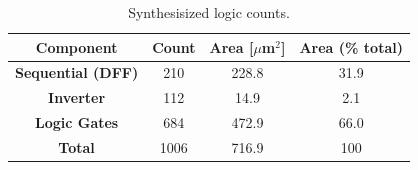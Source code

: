 		\begin{table}[htb!]
			\centering
			\def\arraystretch{1.5}		
			\setlength\arrayrulewidth{0.75pt}
			\setlength{\tabcolsep}{1em} %
			\begin{tabular}{|c|c|c|c|}
				\hline 
				\rule[-1ex]{0pt}{2.5ex} \cellcolor{gray!40}\textbf{Component} & \cellcolor{gray!40}\textbf{Count } & \cellcolor{gray!40}\textbf{Area [$\mu$m$^2$]}& \cellcolor{gray!40}\textbf{Area (\% total)}\\ 
				\hline 
				\rule[-1ex]{0pt}{2.5ex} \textbf{Sequential (DFF)} &  210 & 228.8 & 31.9 \\ 
				\hline 
				\rule[-1ex]{0pt}{2.5ex} \textbf{Inverter} & 112 & 14.9 & 2.1  \\ 
				\hline 
				\rule[-1ex]{0pt}{2.5ex} \textbf{Logic Gates} & 684 & 472.9 & 66.0  \\ 
				\hline 
				\rule[-1ex]{0pt}{2.5ex} \textbf{Total} & 1006 & 716.9 & 100  \\ 
				\hline 
			\end{tabular} 
			\caption{Synthesisized logic counts.}
			\label{tab:log_synth}
		\end{table}   


